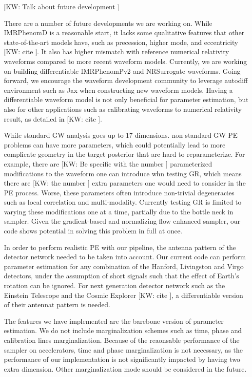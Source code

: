 \documentclass[twocolumn]{aastex631}
\newcommand{\kw}[1]{{\color{rb4}[KW: #1 ]}}
\begin{document}
\kw{Talk about future development}

There are a number of future developments we are working on. While IMRPhenomD is
a reasonable start, it lacks some qualitative features that other
state-of-the-art models have, such as precession, higher mode, and eccentricity \kw{cite}. It
also has higher mismatch with reference numerical relativity waveforms compared
to more recent waveform models. Currently, we are working on building differentiable
IMRPhenomPv2 and NRSurrogate waveforms. Going forward, we encourage the waveform
development community to leverage autodiff environment such as Jax when
constructing new waveform models. Having a differentiable waveform model is not
only beneficial for parameter estimation, but also for other applications such
as calibrating waveforms to numerical relativity result, as detailed in
\kw{cite}.

While standard GW analysis goes up to 17 dimensions. non-standard GW PE problems
can have more parameters, which could potentially lead to more complicate
geometry in the target posterior that are hard to reparameterize. For example,
there are \kw{Be specific with the number} parameterized modifications to the
waveform one can introduce whn testing GR, which means there are \kw{the number}
extra parameters one would need to consider in the PE process. Worse, these
parameters often introduce non-trivial degeneracies such as local correlation
and multi-modality. Currently testing GR is limited to varying these
modifications one at a time, partially due to the bottle neck in sampler. Given
the gradient-based and normalizing flow enhanced sampler, our code shows
potential in solving this problem in full at once.



In order to perform realistic PE with our pipeline, the antenna pattern of the
detector network needed to be taken into account. Our current code can perform
parameter estimation for any combination of the Hanford, Livingston and Virgo
detectors, under the assumption of short signals such that the effect of Earth's
rotation can be ignored. For next generation detector network such as the
Einstein Telescope and the Cosmic Explorer \kw{cite}, a differentiable version
of their antennat pattern is needed.

The features we have implemented are the barebone version of parameter
estimation. We do not include marginalization schemes such as time, phase and
calibration lines marginalization. Because of the reaonsable performance of the sampler on
accelerators, time and phase marginalization is not necessary, as the
performance of our implementation is not significantly impacted by having two
extra dimension. Other marginalization mode should be considered in the future.
\end{document}
